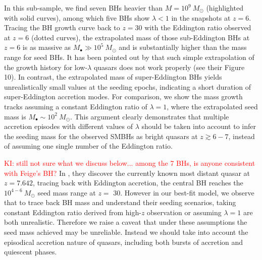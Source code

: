 \documentclass[twocolumn, twocolappendix]{aastex63}
\newcommand{\Msun}{M_\odot}
\newcommand{\Mbh}{M_\bullet}
\newcommand{\tlife}{\tau}
\newcommand{\red}[1]{\textcolor{red}{ #1}}
\begin{document}
\begin{CJK*}{UTF8}{gbsn}
In this sub-sample, we find seven BHs heavier than $M=10^9~\Msun$ (highlighted with solid curves), 
among which five BHs show $\lambda<1$ in the snapshots at $z=6$.
Tracing the BH growth curve back to $z=30$ with the Eddington ratio observed at $z=6$ (dotted curves),
the extrapolated mass of those sub-Eddington BHs at $z=6$ is as massive as $\Mbh \gg 10^5~\Msun$ and is 
substantially higher than the mass range for seed BHs.
%
It has been pointed out by \cite{2019ApJ...880...77O} that such simple extrapolation of the growth history for low-$\lambda$ quasars 
does not work properly (see their Figure 10).
%
In contrast, the extrapolated mass of super-Eddington BHs yields unrealistically small values at the seeding epochs,
indicating a short duration of super-Eddington accretion modes.
For comparison, we show the mass growth tracks assuming a constant Eddington ratio of $\lambda=1$, 
where the extrapolated seed mass is $\Mbh \sim 10^2~\Msun$.
This argument clearly demonstrates that multiple accretion episodes with different values of $\lambda$ should be taken into account 
to infer the seeding mass for the observed SMBHs as bright quasars at $z\gtrsim 6-7$, instead of assuming one single number 
of the Eddington ratio.


\red{KI: still not sure what we discuss below... among the 7 BHs, is anyone consistent with Feige's BH?}
In \citet{2021ApJ...907L...1W}, they discover the currently known most distant quasar at $z=7.642$, 
tracing back with Eddington accretion, the central BH reaches the $10^{4-6}~\Msun$ seed mass range at $z=$ 30. 
However in our best-fit model, we observe that to trace back BH mass and understand their seeding scenarios, 
taking constant Eddington ratio derived from high-$z$ observation or assuming $\lambda=1$ are both unrealistic. 
Therefore we raise a caveat that under these assumptions the seed mass achieved may be unreliable. 
Instead we should take into account the episodical accretion nature of quasars, 
including both bursts of accretion and quiescent phases.




\end{CJK*}
\end{document}
